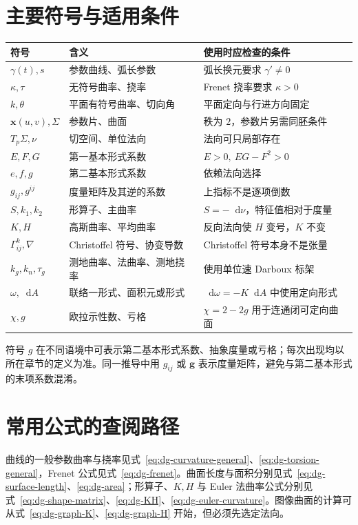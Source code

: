 \documentclass[UTF8,12pt,a4paper,fontset=fandol]{ctexbook}
\newcommand{\dd}{\mathop{}\!\mathrm d}
\begin{document}
\section{主要符号与适用条件}
\begin{longtable}{p{}p{}p{}}
\toprule
符号 & 含义 & 使用时应检查的条件\\
\midrule
\endhead
$\gamma(t),s$ & 参数曲线、弧长参数 & 弧长换元要求 $\gamma'\ne0$\\
$\kappa,\tau$ & 无符号曲率、挠率 & Frenet 挠率要求 $\kappa>0$\\
$k,\theta$ & 平面有符号曲率、切向角 & 平面定向与行进方向固定\\
$\mathbf x(u,v),\Sigma$ & 参数片、曲面 & 秩为 $2$，参数片另需同胚条件\\
$T_p\Sigma,\nu$ & 切空间、单位法向 & 法向可只局部存在\\
$E,F,G$ & 第一基本形式系数 & $E>0,\ EG-F^2>0$\\
$e,f,g$ & 第二基本形式系数 & 依赖法向选择\\
$g_{ij},g^{ij}$ & 度量矩阵及其逆的系数 & 上指标不是逐项倒数\\
$S,k_1,k_2$ & 形算子、主曲率 & $S=-\dd\nu$，特征值相对于度量\\
$K,H$ & 高斯曲率、平均曲率 & 反向法向使 $H$ 变号，$K$ 不变\\
$\Gamma^k_{ij},\nabla$ & Christoffel 符号、协变导数 & Christoffel 符号本身不是张量\\
$k_g,k_n,\tau_g$ & 测地曲率、法曲率、测地挠率 & 使用单位速 Darboux 标架\\
$\omega,\dd A$ & 联络一形式、面积元或形式 & $\dd\omega=-K\dd A$ 中使用定向形式\\
$\chi,g$ & 欧拉示性数、亏格 & $\chi=2-2g$ 用于连通闭可定向曲面\\
\bottomrule
\end{longtable}
符号 $g$ 在不同语境中可表示第二基本形式系数、抽象度量或亏格；每次出现均以所在章节的定义为准。同一推导中用 $g_{ij}$ 或 $\mathbf g$ 表示度量矩阵，避免与第二基本形式的末项系数混淆。

\section{常用公式的查阅路径}
曲线的一般参数曲率与挠率见式~\eqref{eq:dg-curvature-general}、\eqref{eq:dg-torsion-general}，Frenet 公式见式~\eqref{eq:dg-frenet}。曲面长度与面积分别见式~\eqref{eq:dg-surface-length}、\eqref{eq:dg-area}；形算子、$K,H$ 与 Euler 法曲率公式分别见式~\eqref{eq:dg-shape-matrix}、\eqref{eq:dg-KH}、\eqref{eq:dg-euler-curvature}。图像曲面的计算可从式~\eqref{eq:dg-graph-K}、\eqref{eq:dg-graph-H} 开始，但必须先选定法向。
\end{document}
